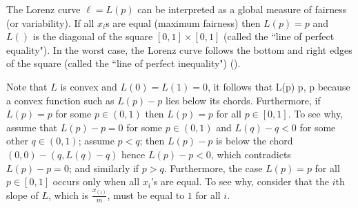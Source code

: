 The Lorenz curve $\ell=L(p)$ can be interpreted
as a global measure of fairness (or variability).
If all $x_i$s are equal (maximum fairness) then
$L(p)= p$ and $L()$ is the diagonal of the square
$[0,1]\times [0,1]$ (called the ``line of perfect
equality"). In the worst case, the Lorenz curve
follows the bottom and right edges of the square
(called the ``line of perfect inequality")
(). 


Note that $L$ is convex and $L(0)=L(1)=0$, it follows that 
  \leq L(p) \leq p, \mfa p\in [0,1]
  \ee
because a convex function such as $L(p)-p$ lies below its chords. Furthermore, if $L(p)=p$ for some $p\in (0,1)$ then $L(p)=p$ for all $p\in [0,1]$. To see why, assume that $L(p)-p=0$ for some $p\in (0,1)$ and $L(q)-q<0$ for some other $q\in (0,1)$; assume $p<q$; then $L(p)-p$ is below the chord $(0,0)-(q,L(q)-q)$ hence $L(p)-p<0$, which contradicts $L(p)-p=0$; and similarly if $p>q$. Furthermore, the case $L(p)=p$ for all $p\in [0,1]$ occurs only when all $x_i$'s are equal. To see why, consider that the $i$th slope of $L$, which is $\frac{x_{(i)}}{m}$, must be equal to $1$ for all $i$. 

